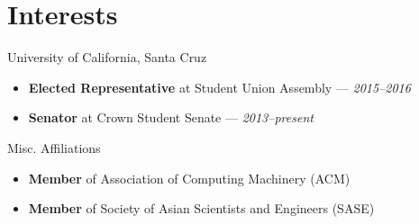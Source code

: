 \documentclass[11pt]{article}
\begin{document}
\section*{Interests}
\begin{description}
  \itemsep0pt \parskip0pt
  \item[Student Government] University of California, Santa Cruz
    \begin{itemize}
      \itemsep0pt \parskip0pt
      \item \textbf{Elected Representative} at Student Union Assembly ---
        \textit{2015--2016}
      \item \textbf{Senator} at Crown Student Senate --- \textit{2013--present}
    \end{itemize}
  \item[Organizations] Misc. Affiliations
    \begin{itemize}
      \item \textbf{Member} of Association of Computing Machinery (ACM)
      \item \textbf{Member} of Society of Asian Scientists and Engineers (SASE)
    \end{itemize}
\end{description}
\end{document}
